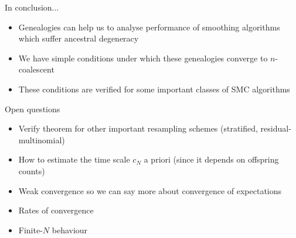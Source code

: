 \documentclass[aspectratio=169]{beamer}
\theoremstyle{definition}
\begin{document}
\begin{frame}{In conclusion...}
\begin{itemize}
\item Genealogies can help us to analyse performance of smoothing algorithms which suffer ancestral degeneracy
\item We have simple conditions under which these genealogies converge to $n$-coalescent
\item These conditions are verified for some important classes of SMC algorithms
\end{itemize}

\pause
Open questions
\begin{itemize}
\item Verify theorem for other important resampling schemes (stratified, residual-multinomial)
\item How to estimate the time scale $c_N$ a priori (since it depends on offspring counts)
\item Weak convergence so we can say more about convergence of expectations
\item Rates of convergence
\item Finite-$N$ behaviour
\end{itemize}
\end{frame}
\end{document}

